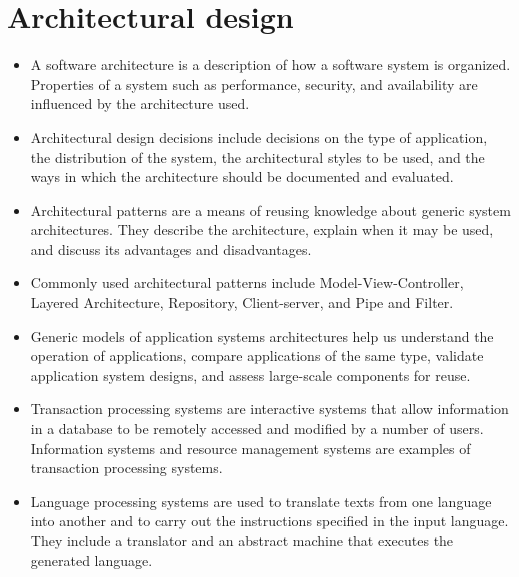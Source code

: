 \documentclass{article}
\begin{document}
\section{Architectural design}
\begin{itemize}
    \item A software architecture is a description of how a software system is organized.  Properties of a system such as performance, security, and availability are influenced by the architecture used.
    \item Architectural design decisions include decisions on the type of application, the distribution of the system, the architectural styles to be used, and the ways in which the architecture should be documented and evaluated.
    \item Architectural patterns are a means of reusing knowledge about generic system architectures.  They describe the architecture, explain when it may be used, and discuss its advantages and disadvantages.
    \item Commonly used architectural patterns include Model-View-Controller, Layered Architecture, Repository, Client-server, and Pipe and Filter.
    \item Generic models of application systems architectures help us understand the operation of applications, compare applications of the same type, validate application system designs, and assess large-scale components for reuse.
    \item Transaction processing systems are interactive systems that allow information in a database to be remotely accessed and modified by a number of users.  Information systems and resource management systems are examples of transaction processing systems.
    \item Language processing systems are used to translate texts from one language into another and to carry out the instructions specified in the input language.  They include a translator and an abstract machine that executes the generated language.
\end{itemize}
\end{document}
